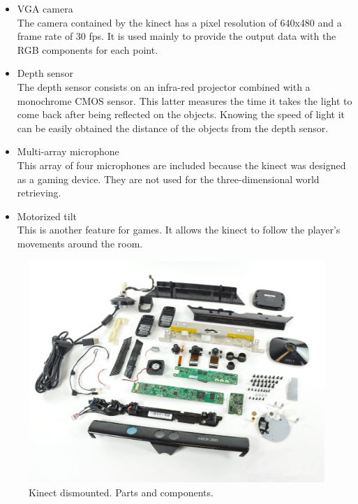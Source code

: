 		\begin{itemize}
			\item{VGA camera}\\
			The camera contained by the kinect has a pixel resolution of 640x480 and a frame rate of 30 fps. It is used mainly to provide the output data with the RGB components for each point. 
			
			\item{Depth sensor}\\
			The depth sensor consists on an infra-red projector combined with a monochrome CMOS sensor. This latter measures the time it takes the light to come back after being reflected on the objects. Knowing the speed of light it can be easily obtained the distance of the objects from the depth sensor. 

			\item{Multi-array microphone}\\
			This array of four microphones are included because the kinect was designed as a gaming device. They are not used for the three-dimensional world retrieving. 
			
			\item{Motorized tilt}\\
			This is another feature for games. It allows the kinect to follow the player's movements around the room. \cite{howkinectworks}
		\end{itemize}



		\begin{figure}[h]
			\begin{center}
			\includegraphics[scale=0.2]{img/kinect/kinect_parts.eps}
			\caption[Kinect Parts]{Kinect dismounted. Parts and components.}
			\end{center}

		\end{figure}


